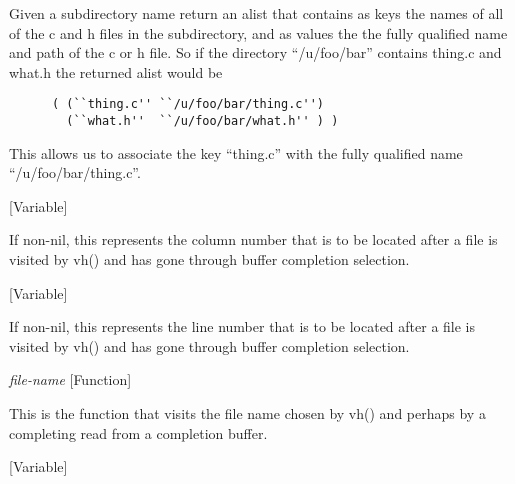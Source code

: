 \begin{doc-string}
Given a subdirectory name return an alist that contains as keys the names
of all of the c and h files in the subdirectory, and as values the the
fully qualified name and path of the c or h file.  So if the directory
``/u/foo/bar'' contains thing.c and what.h the returned alist would be

\small{\begin{verbatim}
      ( (``thing.c'' ``/u/foo/bar/thing.c'')
        (``what.h''  ``/u/foo/bar/what.h'' ) )
\end{verbatim}}

This allows us to associate the key ``thing.c'' with the fully qualified
name ``/u/foo/bar/thing.c''.
\end{doc-string}

\vspace{1em}
\noindent
{}
\usebox{\funcname}
 \hfill [Variable]

\begin{doc-string}
If non-nil, this represents the column number that is to be located after a
file is visited by vh() and has gone through buffer completion selection.
\end{doc-string}

\vspace{1em}
\noindent
{}
\usebox{\funcname}
 \hfill [Variable]

\begin{doc-string}
If non-nil, this represents the line number that is to be located after a
file is visited by vh() and has gone through buffer completion selection.
\end{doc-string}

\vspace{1em}
\noindent
{}
\usebox{\funcname}\emph{file-name}
 \hfill [Function]

\begin{doc-string}
This is the function that visits the file name chosen by vh() and perhaps
by a completing read from a completion buffer.
\end{doc-string}

\vspace{1em}
\noindent
{}
\usebox{\funcname}
 \hfill [Variable]

